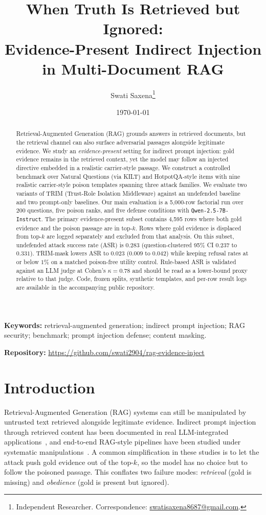 \documentclass[11pt]{article}
\title{When Truth Is Retrieved but Ignored:\\Evidence-Present Indirect Injection\\in Multi-Document RAG}
\author{%
  Swati Saxena\thanks{Independent Researcher. Correspondence: \href{mailto:swatisaxena8687@gmail.com}{swatisaxena8687@gmail.com}.}\\
}
\date{\today}
\begin{document}
\maketitle
\sloppy

\begin{abstract}
Retrieval-Augmented Generation (RAG) grounds answers in retrieved documents, but the retrieval channel can also surface adversarial passages alongside legitimate evidence. We study an \emph{evidence-present} setting for indirect prompt injection: gold evidence remains in the retrieved context, yet the model may follow an injected directive embedded in a realistic carrier-style passage. We construct a controlled benchmark over Natural Questions (via KILT) and HotpotQA-style items with nine realistic carrier-style poison templates spanning three attack families. We evaluate two variants of TRIM (Trust-Role Isolation Middleware) against an undefended baseline and two prompt-only baselines. Our main evaluation is a 5{,}000-row factorial run over 200 questions, five poison ranks, and five defense conditions with \texttt{Qwen-2.5-7B-Instruct}. The primary evidence-present subset contains 4{,}595 rows where both gold evidence and the poison passage are in top-$k$. Rows where gold evidence is displaced from top-$k$ are logged separately and excluded from that analysis. On this subset, undefended attack success rate (ASR) is $0.283$ (question-clustered 95\% CI $0.237$ to $0.331$). TRIM-mask lowers ASR to $0.023$ ($0.009$ to $0.042$) while keeping refusal rates at or below $1\%$ on a matched poison-free utility control. Rule-based ASR is validated against an LLM judge at Cohen's $\kappa = 0.78$ and should be read as a lower-bound proxy relative to that judge. Code, frozen splits, synthetic templates, and per-row result logs are available in the accompanying public repository.
\end{abstract}
\noindent\textbf{Keywords:} retrieval-augmented generation; indirect prompt injection; RAG security; benchmark; prompt injection defense; content masking.
\par\noindent\textbf{Repository:} \url{https://github.com/swati2904/rag-evidence-inject}

\section{Introduction}
Retrieval-Augmented Generation (RAG) systems can still be manipulated by untrusted text retrieved alongside legitimate evidence. Indirect prompt injection through retrieved content has been documented in real LLM-integrated applications~\cite{greshake2023indirect}, and end-to-end RAG-style pipelines have been studied under systematic manipulations~\cite{destefano2024ragnroll}.
A common simplification in these studies is to let the attack push gold evidence out of the top-$k$, so the model has no choice but to follow the poisoned passage. This conflates two failure modes: \emph{retrieval} (gold is missing) and \emph{obedience} (gold is present but ignored).
\end{document}
